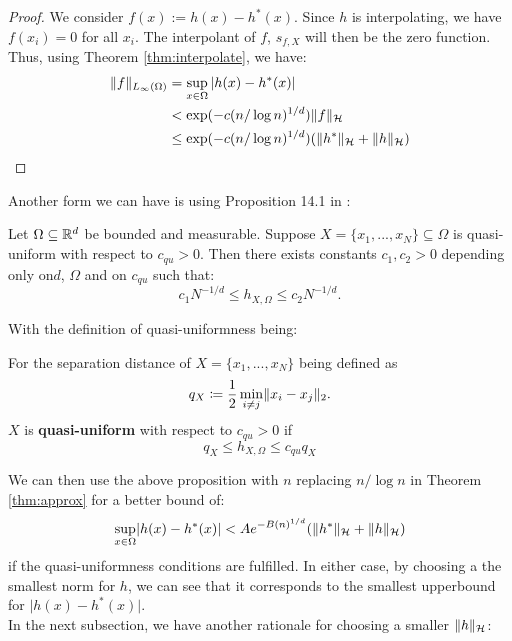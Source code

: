 \documentclass[twoside]{memoir}
\begin{document}
\begin{proof}
	We consider $f(x) := h(x) - h^*(x)$. Since $h$ is interpolating, we have $f(x_i) = 0$ for all $x_i$. The interpolant of $f$, $s_{f,X}$ will then be the zero function. Thus, using Theorem \ref{thm:interpolate}, we have:
	\begin{equation*}
	\begin{split}
	\lVert f\rVert_{L_\infty(\Omega)} &= \sup_{x \in \Omega} \vert h(x) - h^*(x)\vert \\
	&< \exp(-c(n/\log n)^{1/d})\lVert f\rVert_{\mathcal{H}} \\
	&\leq \exp(-c(n/\log n)^{1/d}) (\lVert h^*\rVert_{\mathcal{H}} + \lVert h\rVert_{\mathcal{H}})
	\end{split}
	\end{equation*}
\end{proof}
Another form we can have is using Proposition 14.1 in \cite{ScatteredDataApproximation}:
\begin{prop}
	Let $\Omega \subseteq \mathbb{R}^d$ be bounded and measurable. Suppose $X = \{x_1, ... , x_N\} \subseteq \Omega$ is quasi-uniform with respect to  $c_{qu} > 0$. Then there exists constants $c_1, c_2 > 0$ depending only on$d$, $\Omega$ and on $c_{qu}$ such that:
	\[c_1N^{-1/d} \leq h_{X,\Omega} \leq c_2N^{-1/d}. \]
\end{prop}
With the definition of quasi-uniformness being:
\begin{defn}
	For the separation distance of $X = \{x_1, ... , x_N\}$ being defined as \[q_X \coloneqq \frac{1}{2} \min_{i\neq j} \lVert x_i - x_j\rVert_2. \] $X$ is \textbf{quasi-uniform} with respect to $c_{qu} > 0$ if
	\[ q_X \leq h_{X,\Omega} \leq c_{qu}q_X \]
\end{defn}
We can then use the above proposition with $n$ replacing $n/\log n$ in Theorem \ref{thm:approx} for a better bound of:
\[ \sup_{x \in \Omega} \lvert h(x) - h^*(x)\rvert < A e^{-B(n)^{1/d}} (\lVert h^*\rVert_{\mathcal{H}} + \lVert h\rVert_{\mathcal{H}}) \]
if the quasi-uniformness conditions are fulfilled.
In either case, by choosing a the smallest norm for $h$, we can see that it corresponds to the smallest upperbound for $\vert h(x) - h^*(x)\vert$. \\
In the next subsection, we have another rationale for choosing a smaller $\lVert h\rVert_{\mathcal{H}}$:
\end{document}

